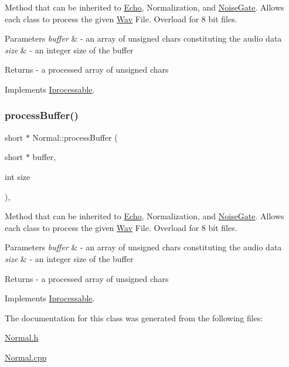Method that can be inherited to \hyperlink{classEcho}{Echo}, Normalization, and \hyperlink{classNoiseGate}{Noise\+Gate}. Allows each class to process the given \hyperlink{classWav}{Wav} File. Overload for 8 bit files. 
\begin{DoxyParams}{Parameters}
{\em buffer} & -\/ an array of unsigned chars constituting the audio data \\
\hline
{\em size} & -\/ an integer size of the buffer \\
\hline
\end{DoxyParams}
\begin{DoxyReturn}{Returns}
-\/ a processed array of unsigned chars 
\end{DoxyReturn}


Implements \hyperlink{classIprocessable_a6f0ff631112fba8eb55d9760b41987ea}{Iprocessable}.

\mbox{\label{classNormal_a243a816f6a995ca5145a160b3b3d8b8f}} 
\subsubsection{\texorpdfstring{process\+Buffer()}{processBuffer()}\hspace{0.1cm}{\footnotesize\ttfamily [2/2]}}
{\footnotesize\ttfamily short $\ast$ Normal\+::process\+Buffer (\begin{DoxyParamCaption}\item[{short $\ast$}]{buffer,  }\item[{int}]{size }\end{DoxyParamCaption})\hspace{0.3cm}{\ttfamily [override]}, {\ttfamily [virtual]}}

Method that can be inherited to \hyperlink{classEcho}{Echo}, Normalization, and \hyperlink{classNoiseGate}{Noise\+Gate}. Allows each class to process the given \hyperlink{classWav}{Wav} File. Overload for 8 bit files. 
\begin{DoxyParams}{Parameters}
{\em buffer} & -\/ an array of unsigned chars constituting the audio data \\
\hline
{\em size} & -\/ an integer size of the buffer \\
\hline
\end{DoxyParams}
\begin{DoxyReturn}{Returns}
-\/ a processed array of unsigned chars 
\end{DoxyReturn}


Implements \hyperlink{classIprocessable_a3a379ff1aab98b507892319afbd7eef0}{Iprocessable}.



The documentation for this class was generated from the following files\+:\begin{DoxyCompactItemize}
\item 
\hyperlink{Normal_8h}{Normal.\+h}\item 
\hyperlink{Normal_8cpp}{Normal.\+cpp}\end{DoxyCompactItemize}
